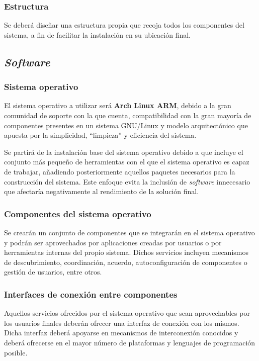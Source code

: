 \subsubsection{Estructura}

Se deberá diseñar una estructura propia que recoja todos los componentes del sistema, a fin de facilitar la instalación en su ubicación final.

\subsection{\textit{Software}}

\subsubsection{Sistema operativo}
\label{problema:sistemaoperativo}

El sistema operativo a utilizar será \textbf{Arch Linux ARM}, debido a la gran comunidad de soporte con la que cuenta, compatibilidad con la gran mayoría de componentes presentes en un sistema GNU/Linux y modelo arquitectónico que apuesta por la simplicidad, ``limpieza'' y eficiencia del sistema.

Se partirá de la instalación base del sistema operativo debido a que incluye el conjunto más pequeño de herramientas con el que el sistema operativo es capaz de trabajar, añadiendo posteriormente aquellos paquetes necesarios para la construcción del sistema. Este enfoque evita la inclusión de \textit{software} innecesario que afectaría negativamente al rendimiento de la solución final.

\subsubsection{Componentes del sistema operativo}

Se crearán un conjunto de componentes que se integrarán en el sistema operativo y podrán ser aprovechados por aplicaciones creadas por usuarios o por herramientas internas del propio sistema. Dichos servicios incluyen mecanismos de descubrimiento, coordinación, acuerdo, autoconfiguración de componentes o gestión de usuarios, entre otros.

\subsubsection{Interfaces de conexión entre componentes}

Aquellos servicios ofrecidos por el sistema operativo que sean aprovechables por los usuarios finales deberán ofrecer una interfaz de conexión con los mismos. Dicha interfaz deberá apoyarse en mecanismos de interconexión conocidos y deberá ofrecerse en el mayor número de plataformas y lenguajes de programación posible.

